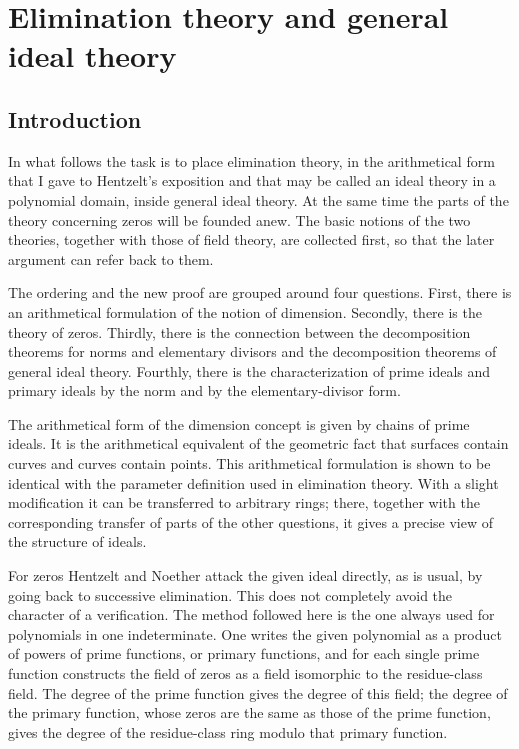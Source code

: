 \documentclass[11pt]{article}
\begin{document}
\newpage

\section{Elimination theory and general ideal theory}

\subsection*{Introduction}

In what follows the task is to place elimination theory, in the arithmetical form that I gave to Hentzelt's exposition and that may be called an ideal theory in a polynomial domain, inside general ideal theory. At the same time the parts of the theory concerning zeros will be founded anew. The basic notions of the two theories, together with those of field theory, are collected first, so that the later argument can refer back to them.

The ordering and the new proof are grouped around four questions. First, there is an arithmetical formulation of the notion of dimension. Secondly, there is the theory of zeros. Thirdly, there is the connection between the decomposition theorems for norms and elementary divisors and the decomposition theorems of general ideal theory. Fourthly, there is the characterization of prime ideals and primary ideals by the norm and by the elementary-divisor form.

The arithmetical form of the dimension concept is given by chains of prime ideals. It is the arithmetical equivalent of the geometric fact that surfaces contain curves and curves contain points. This arithmetical formulation is shown to be identical with the parameter definition used in elimination theory. With a slight modification it can be transferred to arbitrary rings; there, together with the corresponding transfer of parts of the other questions, it gives a precise view of the structure of ideals.

For zeros Hentzelt and Noether attack the given ideal directly, as is usual, by going back to successive elimination. This does not completely avoid the character of a verification. The method followed here is the one always used for polynomials in one indeterminate. One writes the given polynomial as a product of powers of prime functions, or primary functions, and for each single prime function constructs the field of zeros as a field isomorphic to the residue-class field. The degree of the prime function gives the degree of this field; the degree of the primary function, whose zeros are the same as those of the prime function, gives the degree of the residue-class ring modulo that primary function.
\end{document}
